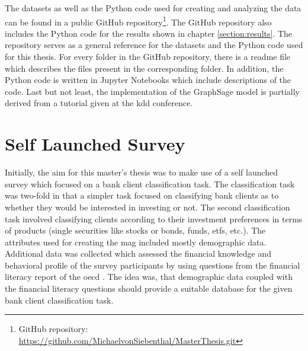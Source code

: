   \noindent The datasets as well as the Python code used for creating and 
  analyzing the data can be found in a public GitHub repository\footnote{GitHub
  repository: \url{https://github.com/MichaelvonSiebenthal/MasterThesis.git}}. 
  The GitHub repository also includes the Python code for the results shown in
  chapter \ref{section:results}. The repository serves as a general reference 
  for the datasets and the Python code used for this thesis. For every folder 
  in the GitHub repository, there is a readme file  which describes the files 
  present in the corresponding folder. In addition, the Python code is written 
  in Jupyter Notebooks which include descriptions of the code. Last but not
  least, the implementation of the GraphSage model is partially derived from 
  a tutorial given at the \acs{kdd} \citeyearpar{kdd2020} conference.

  \section{Self Launched Survey}
  \label{section:self_survey} 

  Initially, the aim for this master's thesis was to make use of a self launched 
  survey which focused on a bank client classification task. The classification 
  task was two-fold in that a simpler task focused on classifying bank clients 
  as to whether they would be interested in investing or not. The second 
  classification task involved classifying clients according to their 
  investment preferences in terms of products (single securities like stocks or 
  bonds, funds, \acsp{etf}, etc.). The attributes used for creating the
  \acs{mag} included mostly demographic data. Additional data was 
  collected which assessed the financial knowledge and behavioral profile of 
  the survey participants by using questions from the financial literacy report 
  of the \acs{oecd} \citeyearpar{OECD2017}. The idea was, that demographic data 
  coupled with the financial literacy questions should provide a suitable 
  database for the given bank client classification task. \\

